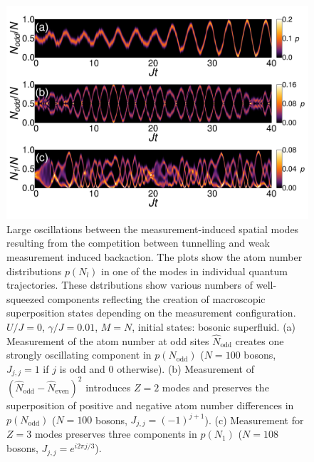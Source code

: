 \begin{figure}[htbp!]
  \centering
  \includegraphics[width=\textwidth]{Oscillations}
  \caption[Macroscopic Oscillations due to Weak Measurement]{Large
    oscillations between the measurement-induced spatial modes
    resulting from the competition between tunnelling and weak
    measurement induced backaction. The plots show the atom number
    distributions $p(N_l)$ in one of the modes in individual quantum
    trajectories. These dstributions show various numbers of
    well-squeezed components reflecting the creation of macroscopic
    superposition states depending on the measurement
    configuration. $U/J = 0$, $\gamma/J = 0.01$, $M=N$, initial
    states: bosonic superfluid. (a) Measurement of the atom number at
    odd sites $\hat{N}_\mathrm{odd}$ creates one strongly oscillating
    component in $p(N_\mathrm{odd})$ ($N = 100$ bosons, $J_{j,j} = 1$
    if $j$ is odd and 0 otherwise). (b) Measurement of
    $(\hat{N}_\mathrm{odd} - \hat{N}_\mathrm{even})^2$ introduces
    $Z = 2$ modes and preserves the superposition of positive and
    negative atom number differences in $p(N_\mathrm{odd})$ ($N = 100$
    bosons, $J_{j,j} = (-1)^{j+1}$). (c) Measurement for $Z = 3$ modes
    preserves three components in $p(N_1)$ ($N = 108$ bosons,
    $J_{j,j} = e^{i 2 \pi j / 3}$).}
  \label{fig:oscillations}
\end{figure}

